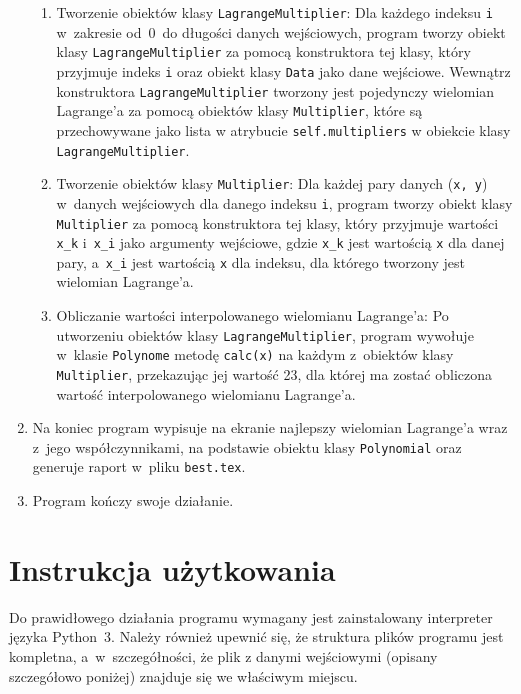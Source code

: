 \documentclass[12pt]{article}
\begin{document}
\begin{enumerate}
\begin{enumerate}
\item Tworzenie obiektów klasy \verb|LagrangeMultiplier|: Dla każdego indeksu \verb|i| w~zakresie od~0~do długości danych wejściowych, program tworzy obiekt klasy \verb|LagrangeMultiplier| za pomocą konstruktora tej klasy, który przyjmuje indeks \verb|i| oraz obiekt klasy \verb|Data| jako dane wejściowe. Wewnątrz konstruktora \verb|LagrangeMultiplier| tworzony jest pojedynczy wielomian Lagrange'a za pomocą obiektów klasy \verb|Multiplier|, które są przechowywane jako lista w atrybucie \verb|self.multipliers| w obiekcie klasy \verb|LagrangeMultiplier|.
\item Tworzenie obiektów klasy \verb|Multiplier|: Dla każdej pary danych (\verb|x, y|) w~danych wejściowych dla danego indeksu \verb|i|, program tworzy obiekt klasy \verb|Multiplier| za pomocą konstruktora tej klasy, który przyjmuje wartości \verb|x_k| i~\verb|x_i| jako argumenty wejściowe, gdzie \verb|x_k| jest wartością \verb|x| dla danej pary, a~\verb|x_i| jest wartością \verb|x| dla indeksu, dla którego tworzony jest wielomian Lagrange'a.
\item Obliczanie wartości interpolowanego wielomianu Lagrange'a: Po utworzeniu obiektów klasy \verb|LagrangeMultiplier|, program wywołuje w~klasie \verb|Polynome| metodę \verb|calc(x)| na każdym z~obiektów klasy \verb|Multiplier|, przekazując jej wartość 23, dla której ma zostać obliczona wartość interpolowanego wielomianu Lagrange'a.
\end{enumerate}
\item Na koniec program wypisuje na ekranie najlepszy wielomian Lagrange'a wraz z~jego współczynnikami, na podstawie obiektu klasy \verb|Polynomial| oraz generuje raport w~pliku \verb|best.tex|.
\item Program kończy swoje działanie.
\end{enumerate}

\section{Instrukcja użytkowania}
Do prawidłowego działania programu wymagany jest zainstalowany interpreter języka Python~3. Należy również upewnić się, że struktura plików programu jest kompletna, a~w~szczegółności, że plik z danymi wejściowymi (opisany szczegółowo poniżej) znajduje się we właściwym miejscu.\\
\end{document}
